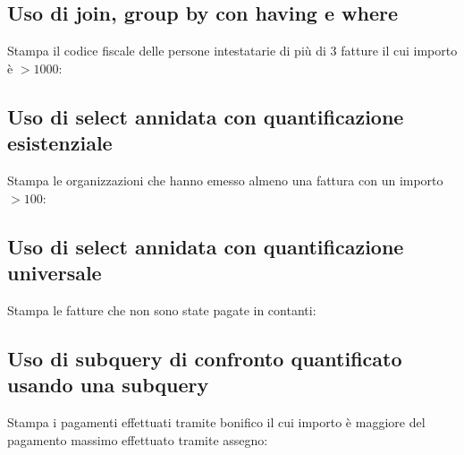 \documentclass[a4paper,12pt]{article}
\begin{document}
\begin{minipage}{\textwidth}

\end{minipage}


 \subsection{ Uso di join, group by con having e where }

Stampa il codice fiscale delle persone intestatarie di più di 3 fatture il cui importo è $> 1000$:

\begin{minipage}{\textwidth}

\end{minipage}

 \subsection{ Uso di select annidata con quantificazione esistenziale }

Stampa le organizzazioni che hanno emesso almeno una fattura con un importo $> 100$:

\begin{minipage}{\textwidth}

\end{minipage}

 \subsection{ Uso di select annidata con quantificazione universale }

Stampa le fatture che non sono state pagate in contanti:

\begin{minipage}{\textwidth}

\end{minipage}

 \subsection{ Uso di subquery di confronto quantificato usando una subquery }

Stampa i pagamenti effettuati tramite bonifico il cui importo è maggiore del pagamento massimo effettuato tramite assegno:

\begin{minipage}{\textwidth}

\end{minipage}
\end{document}
